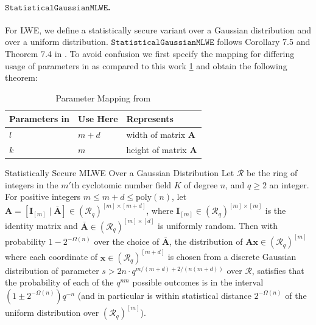 \paragraph{$\texttt{StatisticalGaussianMLWE}$.} For LWE, we define a statistically secure variant over a Gaussian distribution and over a uniform distribution. $\texttt{StatisticalGaussianMLWE}$ follows Corollary 7.5 and Theorem 7.4 in \cite{LPR13}. To avoid confusion we first specify the mapping for differing usage of parameters in \cite{LPR13} as compared to this work \cref{tab:mapping-LPR13} and obtain the following theorem:

\begin{table}
    \centering
    \begin{tabular}[h]{lll}
        \toprule
        Parameters in \cite{LPR13} & Use Here & Represents                    \\\hline
        $l$                        & $m+d$    & width of matrix $\mathbf{A}$  \\
        $k$                        & $m$      & height of matrix $\mathbf{A}$ \\
        \bottomrule
    \end{tabular}
    \caption{Parameter Mapping from \cite{LPR13}}\label{tab:mapping-LPR13}
\end{table}

\begin{theorem}{Statistically Secure MLWE Over a Gaussian Distribution \cite{LPR13}}
    Let $\mathcal{R}$ be the ring of integers in the $m'$th cyclotomic number field $K$ of degree $n$, and $q \geq 2$ an integer.
    For positive integers $m \leq m + d \leq \text{poly}(n)$, let $\mathbf{A} = [ \mathbf{I}_{[m]} \mid \bar{\mathbf{A}}] \in (\mathcal{R}_q)^{[m] \times [m+d]}$, where $\mathbf{I}_{[m]} \in (\mathcal{R}_q)^{[m] \times [m]}$ is the identity matrix and $\bar{\mathbf{A}} \in (\mathcal{R}_q)^{[m] \times [d]}$ is uniformly random.
    Then with probability $1 - 2^{-\Omega(n)}$ over the choice of $\bar{\mathbf{A}}$, the distribution of $\mathbf{A}\mathbf{x} \in (\mathcal{R}_q)^{[m]}$ where each coordinate of $\mathbf{x} \in (\mathcal{R}_q)^{[m+d]}$ is chosen from a discrete Gaussian distribution of parameter $s > 2n \cdot q^{m / (m+d) + 2/(n (m+d))}$ over $\mathcal{R}$, satisfies that the probability of each of the $q^{n m}$ possible outcomes is in the interval $(1 \pm 2^{-\Omega(n)}) q^{-n }$ (and in particular is within statistical distance $2^{-\Omega(n)}$ of the uniform distribution over $(\mathcal{R}_q)^{[m]}$). %
\end{theorem}

